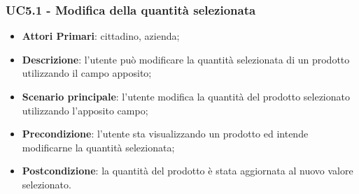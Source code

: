  \subsubsection{UC5.1 - Modifica della quantità selezionata}
 \begin{itemize}
 	\item \textbf{Attori Primari}: cittadino, azienda\glo;
 	\item \textbf{Descrizione}: l'utente può modificare la quantità selezionata di un prodotto utilizzando il campo apposito;
 	\item \textbf{Scenario principale}: l'utente modifica la quantità del prodotto selezionato utilizzando l'apposito campo;
 	\item \textbf{Precondizione}: l'utente sta visualizzando un prodotto ed intende modificarne la quantità selezionata;
 	\item \textbf{Postcondizione}: la quantità del prodotto è stata aggiornata al nuovo valore selezionato.
 \end{itemize}